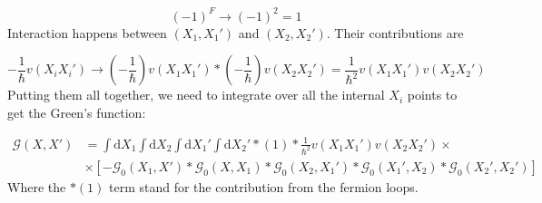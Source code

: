 \begin{equation}
\left( -1 \right)^{F} \to \left( -1 \right)^{2} = 1
\end{equation}
Interaction happens between $\left( X_{1}, X_{1}' \right)$ and $\left( X_{2}, X_{2}' \right)$. Their contributions are

\begin{equation}
- \frac{1}{\hbar} v \left( X_{i} X_{i}' \right)
\to
\left( - \frac{1}{\hbar} \right) v \left( X_{1} X_{1}' \right)
*
\left( - \frac{1}{\hbar} \right) v \left( X_{2} X_{2}' \right)
=
\frac{1}{\hbar^{2}} v \left( X_{1} X_{1}' \right) v \left( X_{2} X_{2}' \right)
\end{equation}
Putting them all together, we need to integrate over all the internal $X_{i}$ points to get the Green's function:

\begin{align}
\mathcal{G} \left( X, X' \right)
&=
\int \text{d}X_{1} \int \text{d}X_{2} \int \text{d}X_{1}' \int \text{d}X_{2}'
*
\left( 1 \right)
*
\frac{1}{\hbar^{2}} v \left( X_{1} X_{1}' \right) v \left( X_{2} X_{2}' \right)
\times \nonumber \\
&\times
\left[
- \mathcal{G}_{0} \left( X_{1}, X' \right)
*
\mathcal{G}_{0} \left( X, X_{1} \right)
*
\mathcal{G}_{0} \left( X_{2}, X_{1}' \right)
*
\mathcal{G}_{0} \left( X_{1}', X_{2} \right)
*
\mathcal{G}_{0} \left( X_{2}', X_{2}' \right)
\right]
\end{align}
Where the $* \left( 1 \right)$ term stand for the contribution from the fermion loops.